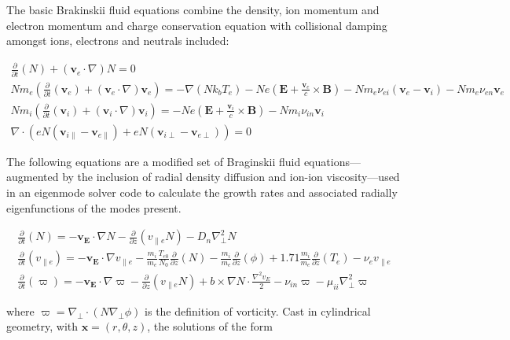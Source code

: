 \documentclass[aip,pop,amsmath,amssymb,reprint,superscriptaddress]{revtex4-1} %
\begin{document}
The basic Brakinskii fluid equations combine the density, ion momentum and electron momentum and charge conservation equation with collisional damping amongst ions, electrons and neutrals included:

\begin{gather}
\frac{\partial}{\partial t}(N) + (\textbf{v}_e \cdot \nabla)N = 0\\
Nm_e(\frac{\partial}{\partial t}(\textbf{v}_e)+(\textbf{v}_e \cdot \nabla)\textbf{v}_e) = -\nabla(Nk_bT_e) -Ne\left(\textbf{E}+ \frac{\textbf{v}_e}{c} \times \textbf{B}\right)-Nm_e\nu_{ei}(\textbf{v}_e-\textbf{v}_i)-Nm_e\nu_{en}\textbf{v}_e\\
Nm_i(\frac{\partial}{\partial t}(\textbf{v}_i)+(\textbf{v}_i \cdot \nabla)\textbf{v}_i) = -Ne\left(\textbf{E}+ \frac{\textbf{v}_i}{c} \times \textbf{B}\right)-Nm_i\nu_{in}\textbf{v}_i\\
\nabla \cdot \left(eN(\textbf{v}_{i\parallel}-\textbf{v}_{e\parallel})+eN(\textbf{v}_{i\perp}-\textbf{v}_{e\perp})\right) = 0
\label{eq:Braginskii}
\end{gather}

The following equations are a modified set of Braginskii fluid equations---augmented by the inclusion of radial density diffusion and ion-ion viscosity---used in an eigenmode solver code to calculate the growth rates and associated radially eigenfunctions of the modes present. 

\begin{gather}
\frac{\partial}{\partial t}(N) = -\textbf{v}_{\textbf{E}} \cdot \nabla N - \frac{\partial}{\partial z}(v_{\parallel e}N) - D_{n}\nabla^{2}_{\perp}N\\
\frac{\partial}{\partial t}(v_{\parallel e}) = -\textbf{v}_{\textbf{E}} \cdot \nabla v_{\parallel e} - \frac{m_{i}}{m_{e}} \frac{T_{e0}}{N_{0}}\frac{\partial}{\partial z}(N)-\frac{m_i}{m_e} \frac{\partial}{\partial z}(\phi) +1.71\frac{m_i}{m_e} \frac{\partial}{\partial z}(T_{e})-\nu_{e}v_{\parallel e}\\
\frac{\partial}{\partial t}(\varpi) = -\textbf{v}_{\textbf{E}} \cdot \nabla\varpi - \frac{\partial}{\partial z}(v_{\parallel e}N) + b\times \nabla N \cdot \frac{\nabla^{2}v_{E}}{2} - \nu_{in}\varpi -\mu_{ii}\nabla^{2}_{\perp}\varpi
\label{eq:eigsolver_eqns}
\end{gather}

where $\varpi = \nabla_{\perp} \cdot (N\nabla_{\perp}\phi)$ is the definition of vorticity. Cast in cylindrical geometry, with $\textbf{x} = (r,\theta,z)$, the solutions of the form
\end{document}

